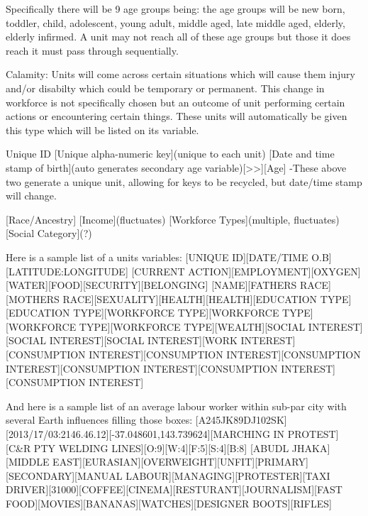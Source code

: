 Specifically there will be 9 age groups being: the age groups will be new born, toddler, child, adolescent, young adult, middle aged, late middle aged, elderly, elderly infirmed. A unit may not reach all of these age groups but those it does reach it must pass through sequentially.


Calamity:
Units will come across certain situations which will cause them injury and/or disabilty which could be temporary or permanent. This change in workforce is not specifically chosen but an outcome of unit performing certain actions or encountering certain things. These units will automatically be given this type which will be listed on its variable.  



Unique ID
[Unique alpha-numeric key](unique to each unit)
[Date and time stamp of birth](auto generates secondary age variable)[>>][Age]
-These above two generate a unique unit, allowing for keys to be recycled, but date/time stamp will change.

[Race/Ancestry]
[Income](fluctuates)
[Workforce Types](multiple, fluctuates)
[Social Category](?)


Here is a sample list of a units variables:
[UNIQUE ID][DATE/TIME O.B][LATITUDE:LONGITUDE]
[CURRENT ACTION][EMPLOYMENT][OXYGEN][WATER][FOOD][SECURITY][BELONGING]
[NAME][FATHERS RACE][MOTHERS RACE][SEXUALITY][HEALTH][HEALTH][EDUCATION TYPE][EDUCATION TYPE][WORKFORCE TYPE][WORKFORCE TYPE]
[WORKFORCE TYPE][WORKFORCE TYPE][WEALTH][SOCIAL INTEREST][SOCIAL INTEREST][SOCIAL INTEREST][WORK INTEREST][CONSUMPTION INTEREST][CONSUMPTION INTEREST][CONSUMPTION INTEREST][CONSUMPTION INTEREST][CONSUMPTION INTEREST][CONSUMPTION INTEREST]

And here is a sample list of an average labour worker within sub-par city with several Earth influences filling those boxes:
[A245JK89DJ102SK][2013/17/03:2146.46.12][-37.048601,143.739624][MARCHING IN PROTEST][C&R PTY WELDING LINES][O:9][W:4][F:5][S:4][B:8]
[ABUDL JHAKA][MIDDLE EAST][EURASIAN][OVERWEIGHT][UNFIT][PRIMARY][SECONDARY][MANUAL LABOUR][MANAGING][PROTESTER][TAXI DRIVER][31000][COFFEE][CINEMA][RESTURANT][JOURNALISM][FAST FOOD][MOVIES][BANANAS][WATCHES][DESIGNER BOOTS][RIFLES]



